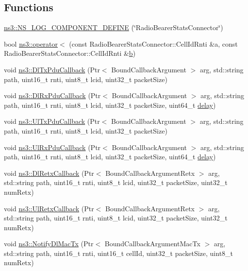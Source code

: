 \subsection*{Functions}
\begin{DoxyCompactItemize}
\item 
\hyperlink{namespacens3_aabb7d96afff59b3dd78573fd57f2a357}{ns3\+::\+N\+S\+\_\+\+L\+O\+G\+\_\+\+C\+O\+M\+P\+O\+N\+E\+N\+T\+\_\+\+D\+E\+F\+I\+NE} (\char`\"{}Radio\+Bearer\+Stats\+Connector\char`\"{})
\item 
bool \hyperlink{namespacens3_a3600cc9e6f77e7d527a7f3b8b3c39f73}{ns3\+::operator$<$} (const Radio\+Bearer\+Stats\+Connector\+::\+Cell\+Id\+Rnti \&a, const Radio\+Bearer\+Stats\+Connector\+::\+Cell\+Id\+Rnti \&\hyperlink{lte__pathloss_8m_a21ad0bd836b90d08f4cf640b4c298e7c}{b})
\item 
void \hyperlink{namespacens3_a7de82f7ed9986b9bcb67951f61e02ff4}{ns3\+::\+Dl\+Tx\+Pdu\+Callback} (Ptr$<$ Bound\+Callback\+Argument $>$ arg, std\+::string path, uint16\+\_\+t rnti, uint8\+\_\+t lcid, uint32\+\_\+t packet\+Size)
\item 
void \hyperlink{namespacens3_ae4fb5123d8a56fce742428b530ec4197}{ns3\+::\+Dl\+Rx\+Pdu\+Callback} (Ptr$<$ Bound\+Callback\+Argument $>$ arg, std\+::string path, uint16\+\_\+t rnti, uint8\+\_\+t lcid, uint32\+\_\+t packet\+Size, uint64\+\_\+t \hyperlink{mmwave_2model_2fading-traces_2fading__trace__generator_8m_a7964e6aa8f61a9d28973c8267a606ad8}{delay})
\item 
void \hyperlink{namespacens3_ae624428f0992ac62a3c5f2e7318fb98e}{ns3\+::\+Ul\+Tx\+Pdu\+Callback} (Ptr$<$ Bound\+Callback\+Argument $>$ arg, std\+::string path, uint16\+\_\+t rnti, uint8\+\_\+t lcid, uint32\+\_\+t packet\+Size)
\item 
void \hyperlink{namespacens3_a269527c03607c9c885d7cff7667ec5e0}{ns3\+::\+Ul\+Rx\+Pdu\+Callback} (Ptr$<$ Bound\+Callback\+Argument $>$ arg, std\+::string path, uint16\+\_\+t rnti, uint8\+\_\+t lcid, uint32\+\_\+t packet\+Size, uint64\+\_\+t \hyperlink{mmwave_2model_2fading-traces_2fading__trace__generator_8m_a7964e6aa8f61a9d28973c8267a606ad8}{delay})
\item 
void \hyperlink{namespacens3_a5778b5cac8d73d89a93bab0e1b460ed5}{ns3\+::\+Dl\+Retx\+Callback} (Ptr$<$ Bound\+Callback\+Argument\+Retx $>$ arg, std\+::string path, uint16\+\_\+t rnti, uint8\+\_\+t lcid, uint32\+\_\+t packet\+Size, uint32\+\_\+t num\+Retx)
\item 
void \hyperlink{namespacens3_a80a98b047bc7a9039be0e3e1cd3bb927}{ns3\+::\+Ul\+Retx\+Callback} (Ptr$<$ Bound\+Callback\+Argument\+Retx $>$ arg, std\+::string path, uint16\+\_\+t rnti, uint8\+\_\+t lcid, uint32\+\_\+t packet\+Size, uint32\+\_\+t num\+Retx)
\item 
void \hyperlink{namespacens3_a1f1933361c16797838c1358b49c5a215}{ns3\+::\+Notify\+Dl\+Mac\+Tx} (Ptr$<$ Bound\+Callback\+Argument\+Mac\+Tx $>$ arg, std\+::string path, uint16\+\_\+t rnti, uint16\+\_\+t cell\+Id, uint32\+\_\+t packet\+Size, uint8\+\_\+t num\+Retx)
\end{DoxyCompactItemize}
